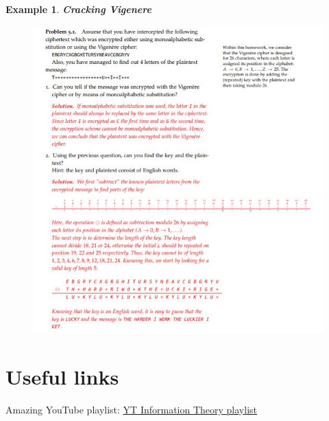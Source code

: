 \documentclass[titlepage]{article}
\newtheorem{example}{Example}[section]
\begin{document}
\begin{example}\textbf{Cracking Vigenere}
\begin{figure}[H]
    \centering
    \includegraphics{src/vig.JPG}

    \label{fig:my_label}
\end{figure}
\end{example}



\section{Useful links}
Amazing YouTube playlist: \hyperlink{ https://www.youtube.com/playlist?list=PLE125425EC837021F}{YT Information Theory playlist}
\end{document}
